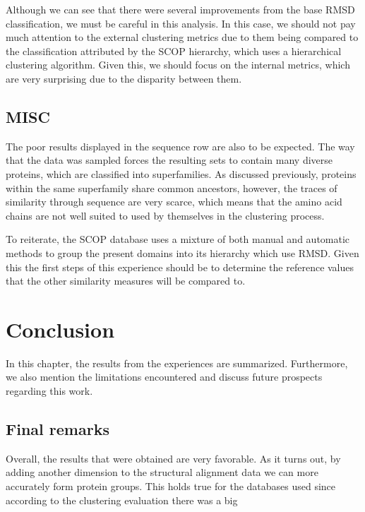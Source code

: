 Although we can see that there were several improvements from the base RMSD classification, we must be careful in this analysis. In this case, we should not pay much attention to the external clustering metrics due to them being compared to the classification attributed by the SCOP hierarchy, which uses a hierarchical clustering algorithm. Given this, we should focus on the internal metrics, which are very surprising due to the disparity between them.


\section{MISC}

The poor results displayed in the sequence row are also to be expected. The way that the data was sampled forces the resulting sets to contain many diverse proteins, which are classified into superfamilies. As discussed previously, proteins within the same superfamily share common ancestors, however, the traces of similarity through sequence are very scarce, which means that the amino acid chains are not well suited to used by themselves in the clustering process.

To reiterate, the SCOP database uses a mixture of both manual and automatic methods to group the present domains into its hierarchy which use RMSD. Given this the first steps of this experience should be to determine the reference values that the other similarity measures will be compared to.

\chapter{Conclusion}

In this chapter, the results from the experiences are summarized. Furthermore, we also mention the limitations encountered and discuss future prospects regarding this work.

\section{Final remarks}

Overall, the results that were obtained are very favorable. As it turns out, by adding another dimension to the structural alignment data we can more accurately form protein groups. This holds true for the databases used since according to the clustering evaluation there was a big

